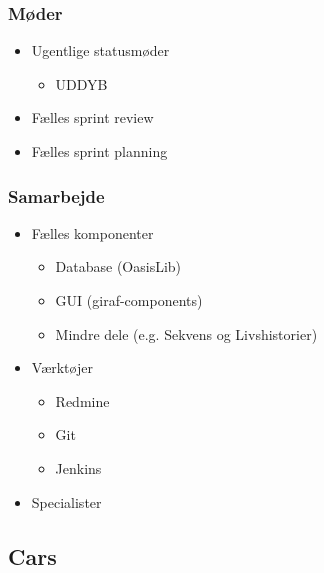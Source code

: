 \begin{frame}
\frametitle{Møder}

\begin{itemize}
\item Ugentlige statusmøder
\begin{itemize}
\item UDDYB
\end{itemize}
\item Fælles sprint review
\item Fælles sprint planning
\end{itemize}

\end{frame}

\begin{frame}
\frametitle{Samarbejde}

\begin{itemize}
\item Fælles komponenter
\begin{itemize}
\item Database (OasisLib)
\item GUI (giraf-components)
\item Mindre dele (e.g. Sekvens og Livshistorier)
\end{itemize}
\item Værktøjer
\begin{itemize}
\item Redmine
\item Git
\item Jenkins
\end{itemize}
\item Specialister
\end{itemize}

\end{frame}

\subsection{Cars}

